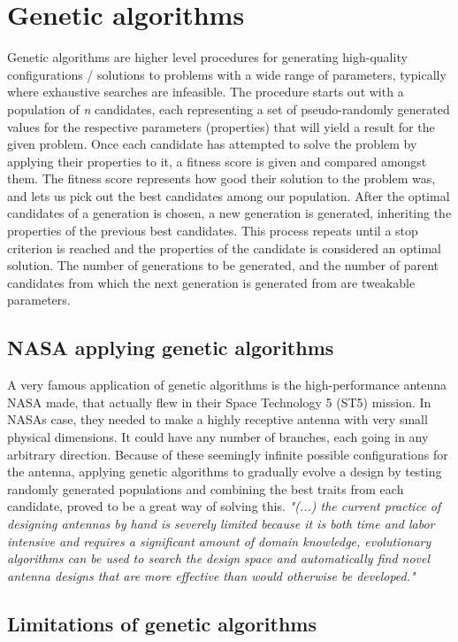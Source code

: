 \documentclass[a4paper,english]{report}
\begin{document}
			\section{Genetic algorithms}
			Genetic algorithms are higher level procedures for generating high-quality configurations / solutions to problems with a wide range of parameters, typically where exhaustive searches are infeasible. The procedure starts out with a population of \textit{n} candidates, each representing a set of pseudo-randomly generated values for the respective parameters (properties) that will yield a result for the given problem. Once each candidate has attempted to solve the problem by applying their properties to it, a fitness score is given and compared amongst them. The fitness score represents how good their solution to the problem was, and lets us pick out the best candidates among our population. After the optimal candidates of a generation is chosen, a new generation is generated, inheriting the properties of the previous best candidates. This process repeats until a stop criterion is reached and the properties of the candidate is considered an optimal solution. The number of generations to be generated, and the number of parent candidates from which the next generation is generated from are tweakable parameters. 
			\subsection{NASA applying genetic algorithms}A very famous application of genetic algorithms is the high-performance antenna NASA made, that actually flew in their Space Technology 5 (ST5) mission\cite{nasa}. In NASAs case, they needed to make a highly receptive antenna with very small physical dimensions. It could have any number of branches, each going in any arbitrary direction. Because of these seemingly infinite possible configurations for the antenna, applying genetic algorithms to gradually evolve a design by testing randomly generated populations and combining the best traits from each candidate, proved to be a great way of solving this. \emph{"(...) the current practice of designing antennas by hand is severely limited because it is both time and labor intensive and requires a significant amount of domain knowledge, evolutionary algorithms can be used to search the design space and automatically find novel antenna designs that are more effective than would otherwise be developed."}\cite{nasa}
				\subsection{Limitations of genetic algorithms}
\end{document}
